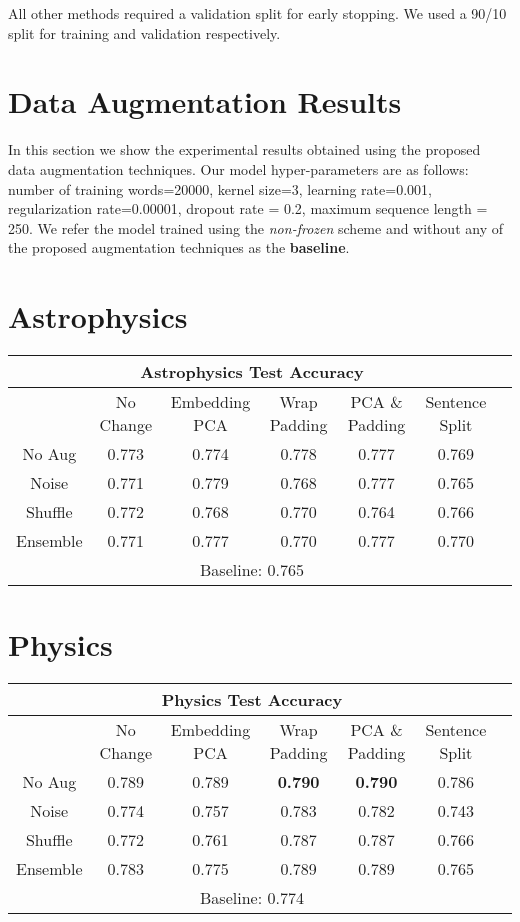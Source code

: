 All other methods required a validation split for early stopping. We used a 90/10 split for training and validation respectively.

\section{Data Augmentation Results}
In this section we show the experimental results obtained using the proposed data augmentation techniques. Our model hyper-parameters are as follows:
number of training words=20000, kernel size=3, learning rate=0.001, regularization rate=0.00001,
dropout rate = 0.2, maximum sequence length = 250. We refer the model trained using the \textit{non-frozen} scheme
and without any of the proposed augmentation techniques as the \textbf{baseline}.

\section{Astrophysics}
\begin{center}
\begin{tabular}{|c||c|c|c|c|c|c|}
 \hline
 \multicolumn{6}{|c|}{\textbf{Astrophysics Test Accuracy}}\\ \hline
  & No Change & Embedding PCA & Wrap Padding & PCA \& Padding & Sentence Split\\  \hline
  No Aug & 0.773 & 0.774 & 0.778 & 0.777 & 0.769 \\ \hline
  Noise &  0.771 & 0.779 & 0.768 & 0.777 & 0.765  \\  \hline
  Shuffle & 0.772 & 0.768 & 0.770 & 0.764 & 0.766 \\      \hline
  Ensemble & 0.771 & 0.777 &  0.770 & 0.777 & 0.770 \\      \hline
  \multicolumn{6}{|c|}{Baseline: 0.765}\\ \hline
  \end{tabular}
  \end{center}

\section{Physics}
  \begin{center}
  \begin{tabular}{|c||c|c|c|c|c|c|}
   \hline
   \multicolumn{6}{|c|}{\textbf{Physics Test Accuracy}}\\ \hline
    & No Change & Embedding PCA & Wrap Padding & PCA \& Padding & Sentence Split\\  \hline
    No Aug & 0.789 & 0.789 & \textbf{0.790} & \textbf{0.790} & 0.786 \\ \hline
    Noise &  0.774 & 0.757 & 0.783 & 0.782 & 0.743  \\  \hline
    Shuffle & 0.772 & 0.761 & 0.787 & 0.787 & 0.766 \\      \hline
    Ensemble & 0.783 & 0.775 &  0.789 & 0.789 & 0.765 \\      \hline
    \multicolumn{6}{|c|}{Baseline: 0.774}\\ \hline
    \end{tabular}
    \end{center}
